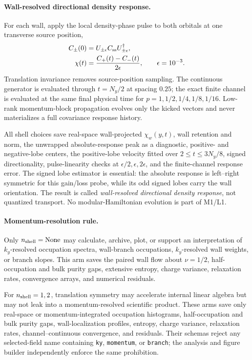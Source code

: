 \documentclass[aps,prx,twocolumn,floatfix,nofootinbib,superscriptaddress,longbibliography]{revtex4-2}
\newcommand{\code}[1]{\texttt{#1}}
\begin{document}
\paragraph*{Wall-resolved directional density response.}
For each wall, apply the local density-phase pulse to both orbitals at one transverse
source position,
\begin{equation}
 \begin{aligned}
 C_{\pm}(0)&=U_{\pm\epsilon}C_{\rm ss}U_{\pm\epsilon}^{\dagger},\\
 \chi(t)&=\frac{C_+(t)-C_-(t)}{2\epsilon},\qquad \epsilon=10^{-3}.
 \end{aligned}
 \label{eq:M1-density-response}
\end{equation}
Translation invariance removes source-position sampling.  The continuous generator is
evaluated through $t=N_y/2$ at spacing $0.25$; the exact finite channel is evaluated at
the same final physical time for $p=1,1/2,1/4,1/8,1/16$.  Low-rank momentum-block
propagation evolves only the kicked vectors and never materializes a full covariance
response history.

All shell choices save real-space wall-projected $\chi_w(y,t)$, wall retention and norm,
the unwrapped absolute-response peak as a diagnostic, positive- and negative-lobe
centers, the positive-lobe velocity fitted over $2\leq t\leq3N_y/8$, signed
directionality, pulse-linearity checks at $\epsilon/2,\epsilon,2\epsilon$, and the
finite-channel response error.  The signed lobe estimator is essential: the absolute
response is left--right symmetric for this gain/loss probe, while its odd signed lobes
carry the wall orientation.  The result is called \emph{wall-resolved directional density
response}, not quantized transport.  No modular-Hamiltonian evolution is part of M1/L1.

\paragraph*{Momentum-resolution rule.}
Only $n_{\rm shell}=\mathrm{None}$ may calculate, archive, plot, or support an
interpretation of $k_y$-resolved occupation spectra, wall-branch occupations,
$k_y$-resolved wall weights, or branch slopes.  This arm saves the paired wall flow about
$\nu=1/2$, half-occupation and bulk purity gaps, extensive entropy, charge variance,
relaxation rates, convergence arrays, and numerical residuals.

For $n_{\rm shell}=1,2$, translation symmetry may accelerate internal linear algebra but
may not leak into a momentum-resolved scientific product.  These arms save only
real-space or momentum-integrated occupation histograms, half-occupation and bulk purity
gaps, wall-localization profiles, entropy, charge variance, relaxation rates,
channel--continuous convergence, and residuals.  Their schemas reject any selected-field
name containing \code{ky}, \code{momentum}, or \code{branch}; the analysis and figure
builder independently enforce the same prohibition.
\end{document}
